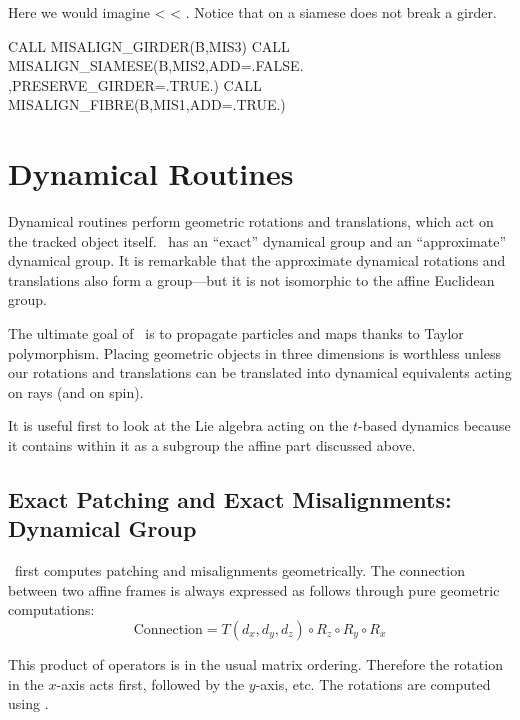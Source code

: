 Here we would imagine  <  < . Notice that 
 on a siamese does not break a girder.

\begin{ptccode}
CALL MISALIGN_GIRDER(B,MIS3)
CALL MISALIGN_SIAMESE(B,MIS2,ADD=.FALSE. ,PRESERVE_GIRDER=.TRUE.)
CALL MISALIGN_FIBRE(B,MIS1,ADD=.TRUE.)
\end{ptccode}


\section{Dynamical Routines}

%
Dynamical routines perform geometric rotations and translations, which act on the
tracked object itself. \PTC\ has an ``exact'' dynamical group and an ``approximate''
dynamical group. It is remarkable that the approximate dynamical rotations and
translations also form a group---but it is not isomorphic to the affine Euclidean group.

The ultimate goal of \PTC\ is to propagate particles and maps thanks to Taylor
polymorphism. Placing geometric objects in three dimensions is worthless unless
our rotations and translations can be translated into dynamical equivalents acting
on rays (and on spin).

%
It is useful first to look at the Lie algebra acting on the $t$-based dynamics because it
contains within it as a subgroup the affine part discussed above.


\subsection{Exact Patching and Exact Misalignments: Dynamical Group}

%
\PTC\ first computes patching and misalignments geometrically. The connection
between two affine frames is always expressed as follows through pure
geometric computations:
\begin{equation*}
  \text{Connection} = T(d_x,d_y,d_z) \circ R_z \circ R_y \circ R_x
\end{equation*}

This product of operators is in the usual matrix ordering. Therefore
the rotation in the $x$-axis acts first, followed by the $y$-axis, etc.
The rotations are computed using .

